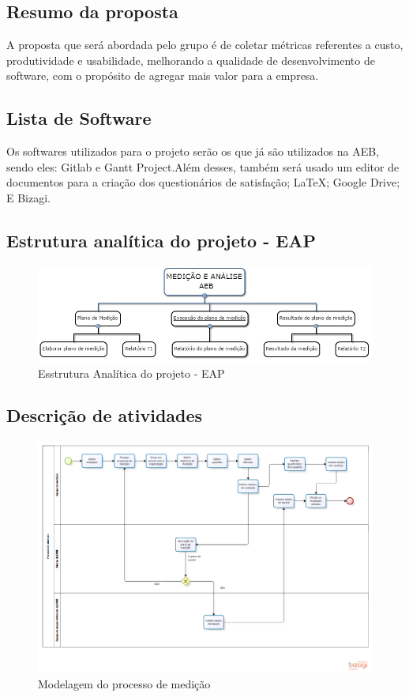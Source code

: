 \subsection{Resumo da proposta}
	A proposta que será abordada pelo grupo é de coletar métricas referentes a custo, produtividade e usabilidade, melhorando a qualidade de desenvolvimento de software, com o propósito de agregar mais valor para a empresa.

\subsection{Lista de Software}
	Os softwares utilizados para o projeto serão os que já são utilizados na AEB, sendo eles: Gitlab e Gantt Project.Além desses, também será usado um editor de documentos para a criação dos questionários de satisfação; LaTeX; Google Drive; E Bizagi.

\subsection{Estrutura analítica do projeto - EAP}

\begin{figure}[H]
	\centering
	\includegraphics[width=\textwidth,height=\textheight,keepaspectratio]{conteudo/imgs/eap}
	\caption{Esstrutura Analítica do projeto - EAP}
	\label{img:eap}
\end{figure}

\subsection{Descrição de atividades}

\begin{figure}[H]
	\centering
	\includegraphics[width=\textwidth,height=\textheight,keepaspectratio]{conteudo/imgs/medicao}
	\caption{Modelagem do processo de medição}
	\label{img:modelagem1}
\end{figure}

